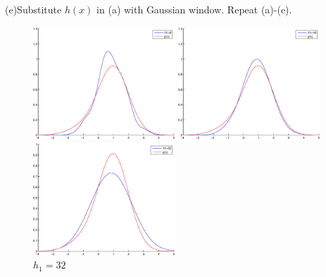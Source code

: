\documentclass{article}
\theoremstyle{definition}
\theoremstyle{definition}
\theoremstyle{remark}
\begin{document}
(e)Substitute $h(x)$ in (a) with Gaussian window. Repeat (a)-(e).
\begin{figure}[!htbp]
\begin{minipage}[t]{0.3\linewidth}
\centering
\includegraphics[width=2.1in]{g_8.eps}
\caption{$h_1=8$}
\end{minipage}%
\begin{minipage}[t]{0.3\linewidth}
\centering
\includegraphics[width=2.1in]{g_16.eps}
\caption{$h_1=16$}
\end{minipage}
\begin{minipage}[t]{0.3\linewidth}
\centering
\includegraphics[width=2.1in]{g_32.eps}
\caption{$h_1=32$}
\end{minipage}
\end{figure}
\end{document}
